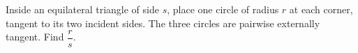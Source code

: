Inside an equilateral triangle of side $s$, place one circle of radius $r$ at each corner, tangent to its two incident sides. The three circles are pairwise externally tangent. Find $\dfrac{r}{s}$.
